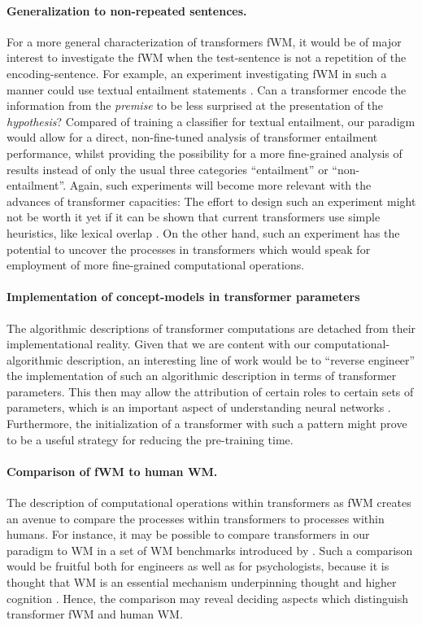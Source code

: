 \paragraph{Generalization to non-repeated sentences.} For a more general characterization of transformers fWM, it would be of major interest to investigate the fWM when the test-sentence is not a repetition of the encoding-sentence.
For example, an experiment investigating fWM in such a manner could use textual entailment statements \parencite{dagan_pascal_2006}.
Can a transformer encode the information from the \textit{premise} to be less surprised at the presentation of the \textit{hypothesis}?
Compared of training a classifier for textual entailment, our paradigm would allow for a direct, non-fine-tuned analysis of transformer entailment performance, whilst providing the possibility for a more fine-grained analysis of results instead of only the usual three categories ``entailment'' or ``non-entailment''.
Again, such experiments will become more relevant with the advances of transformer capacities:
The effort to design such an experiment might not be worth it yet if it can be shown that current transformers use simple heuristics, like lexical overlap \parencite{mccoy_right_2019}.
On the other hand, such an experiment has the potential to uncover the processes in transformers which would speak for employment of more fine-grained computational operations.

\paragraph{Implementation of concept-models in transformer parameters} The algorithmic descriptions of transformer computations are detached from their implementational reality.
Given that we are content with our computational-algorithmic description, an interesting line of work would be to ``reverse engineer'' the implementation of such an algorithmic description in terms of transformer parameters.
This then may allow the attribution of certain roles to certain sets of parameters, which is an important aspect of understanding neural networks \parencite{mccloskey_networks_1991}.
Furthermore, the initialization of a transformer with such a pattern might prove to be a useful strategy for reducing the pre-training time.

\paragraph{Comparison of fWM to human WM.} The description of computational operations within transformers as fWM creates an avenue to compare the processes within transformers to processes within humans.
For instance, it may be possible to compare transformers in our paradigm to WM in a set of WM benchmarks introduced by \textcite{oberauer_benchmarks_2018}.
Such a comparison would be fruitful both for engineers as well as for psychologists, because it is thought that WM is an essential mechanism underpinning thought and higher cognition \parencite{baddeley_working_2003}.
Hence, the comparison may reveal deciding aspects which distinguish transformer fWM and human WM.

